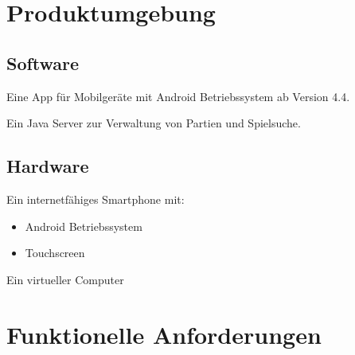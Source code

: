\documentclass[parskip=full]{scrartcl}
\begin{document}
\section{Produktumgebung}
	\subsection{Software}
		\begin{description}
			\item Eine App für Mobilgeräte mit \gls{Android} Betriebssystem ab Version 4.4.
			\item Ein Java Server zur Verwaltung von Partien und Spielsuche.		
		\end{description}
	\subsection{Hardware}
		\begin{description}			
			\item Ein internetfähiges \gls{Smartphone} mit:
			\begin{itemize}
			\item \gls{Android} Betriebssystem
			\item Touchscreen
			\end{itemize}
		\item Ein virtueller Computer
		\end{description}
\pagebreak		  
\section{Funktionelle Anforderungen}
\end{document}
